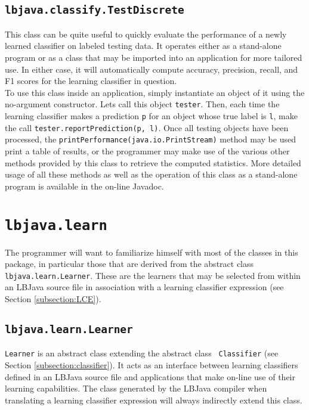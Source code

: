 \subsection{{\tt lbjava.classify.TestDiscrete}} \label{subsection:testDiscrete}
This class can be quite useful to quickly evaluate the performance of a newly
learned classifier on labeled testing data.  It operates either as a
stand-alone program or as a class that may be imported into an application for
more tailored use.  In either case, it will automatically compute accuracy,
precision, recall, and F1 scores for the learning classifier in question. \\

To use this class inside an application, simply instantiate an object of it
using the no-argument constructor.  Lets call this object {\tt tester}.  Then,
each time the learning classifier makes a prediction {\tt p} for an object
whose true label is {\tt l}, make the call
{\tt tester.reportPrediction(p, l)}.  Once all testing objects have been
processed, the {\tt printPerformance(java.io.PrintStream)} method may be used
print a table of results, or the programmer may make use of the various other
methods provided by this class to retrieve the computed statistics.  More
detailed usage of all these methods as well as the operation of this class as
a stand-alone program is available in the on-line Javadoc.

\section{{\tt lbjava.learn}}

The programmer will want to familiarize himself with most of the classes in
this package, in particular those that are derived from the abstract class
{\tt lbjava.learn.Learner}.  These are the learners that may be selected from
within an LBJava source file in association with a learning classifier expression
(see Section \ref{subsection:LCE}).

\subsection{{\tt lbjava.learn.Learner}} \label{subsection:learner}
{\tt Learner} is an abstract class extending the abstract class {\tt
Classifier} (see Section \ref{subsection:classifier}).  It acts as an
interface between learning classifiers defined in an LBJava source file and
applications that make on-line use of their learning capabilities.  The class
generated by the LBJava compiler when translating a learning classifier
expression will always indirectly extend this class. \\

